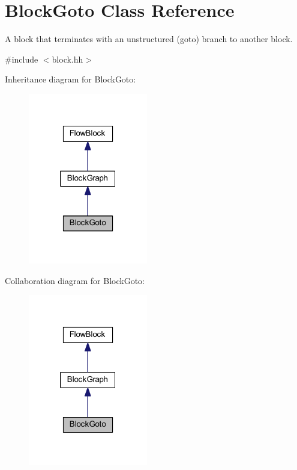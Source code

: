 \hypertarget{class_block_goto}{}\section{Block\+Goto Class Reference}
\label{class_block_goto}


A block that terminates with an unstructured (goto) branch to another block.  




{\ttfamily \#include $<$block.\+hh$>$}



Inheritance diagram for Block\+Goto\+:
\nopagebreak
\begin{figure}[H]
\begin{center}
\leavevmode
\includegraphics[width=148pt]{class_block_goto__inherit__graph}
\end{center}
\end{figure}


Collaboration diagram for Block\+Goto\+:
\nopagebreak
\begin{figure}[H]
\begin{center}
\leavevmode
\includegraphics[width=148pt]{class_block_goto__coll__graph}
\end{center}
\end{figure}
